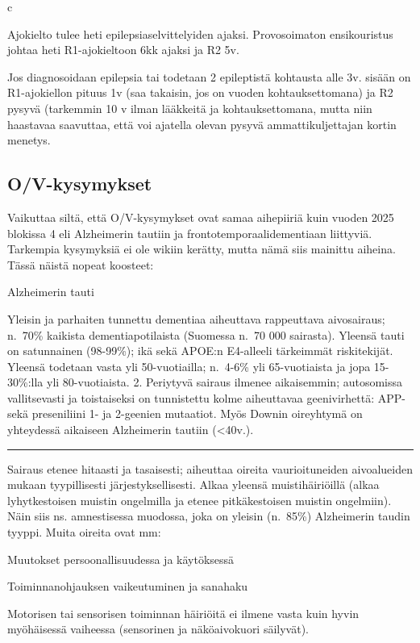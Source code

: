 \documentclass[
]{book}
\begin{document}
c

Ajokielto tulee heti epilepsiaselvittelyiden ajaksi. Provosoimaton ensikouristus johtaa heti R1-ajokieltoon 6kk ajaksi ja R2 5v.

Jos diagnosoidaan epilepsia tai todetaan 2 epileptistä kohtausta alle 3v. sisään on R1-ajokiellon pituus 1v (saa takaisin, jos on vuoden kohtauksettomana) ja R2 pysyvä (tarkemmin 10 v ilman lääkkeitä ja kohtauksettomana, mutta niin haastavaa saavuttaa, että voi ajatella olevan pysyvä ammattikuljettajan kortin menetys.

\subsection{O/V-kysymykset}\label{ov-kysymykset}

Vaikuttaa siltä, että O/V-kysymykset ovat samaa aihepiiriä kuin vuoden 2025 blokissa 4 eli Alzheimerin tautiin ja frontotemporaalidementiaan liittyviä. Tarkempia kysymyksiä ei ole wikiin kerätty, mutta nämä siis mainittu aiheina. Tässä näistä nopeat koosteet:

Alzheimerin tauti

Yleisin ja parhaiten tunnettu dementiaa aiheuttava rappeuttava aivosairaus; n.~70\% kaikista dementiapotilaista (Suomessa n.~70 000 sairasta). Yleensä tauti on satunnainen (98-99\%); ikä sekä APOE:n E4-alleeli tärkeimmät riskitekijät. Yleensä todetaan vasta yli 50-vuotiailla; n.~4-6\% yli 65-vuotiaista ja jopa 15-30\%:lla yli 80-vuotiaista. 2. Periytyvä sairaus ilmenee aikaisemmin; autosomissa vallitsevasti ja toistaiseksi on tunnistettu kolme aiheuttavaa geenivirhettä: APP- sekä preseniliini 1- ja 2-geenien mutaatiot. Myös Downin oireyhtymä on yhteydessä aikaiseen Alzheimerin tautiin (\textless40v.).

\begin{center}\rule{0.5\linewidth}{0.5pt}\end{center}

Sairaus etenee hitaasti ja tasaisesti; aiheuttaa oireita vaurioituneiden aivoalueiden mukaan tyypillisesti järjestyksellisesti. Alkaa yleensä muistihäiriöillä (alkaa lyhytkestoisen muistin ongelmilla ja etenee pitkäkestoisen muistin ongelmiin). Näin siis ns. amnestisessa muodossa, joka on yleisin (n.~85\%) Alzheimerin taudin tyyppi. Muita oireita ovat mm:

Muutokset persoonallisuudessa ja käytöksessä

Toiminnanohjauksen vaikeutuminen ja sanahaku

Motorisen tai sensorisen toiminnan häiriöitä ei ilmene vasta kuin hyvin myöhäisessä vaiheessa (sensorinen ja näköaivokuori säilyvät).
\end{document}
